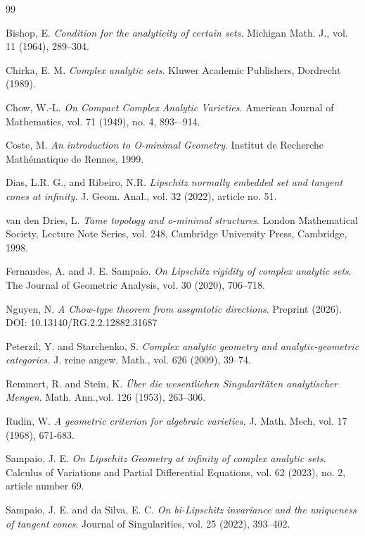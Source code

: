 \documentclass[a4paper,11pt]{amsart}
\begin{document}
\begin{thebibliography}{99}

{Bishop, E.} 
{\it Condition for the analyticity of certain sets}. 
Michigan Math. J., vol. 11 (1964), 289--304. 

{Chirka, E. M.}
{\it Complex analytic sets}.
Kluwer Academic Publishers, Dordrecht (1989).

{Chow, W.-L.}
{\it  On Compact Complex Analytic Varieties}. 
American Journal of Mathematics, vol. 71 (1949), no. 4, 893-–914. 

{Coste, M.}
{\it An introduction to O-minimal Geometry}. 
Institut de Recherche Math\'ematique de Rennes, 1999.

{Dias, L.R. G., and Ribeiro, N.R.}
{\it Lipschitz normally embedded set and tangent cones at infinity}. 
J. Geom. Anal., vol. 32 (2022), article no. 51.

van den Dries, L.
{\it Tame topology and o-minimal structures}. London Mathematical Society,
Lecture Note Series, vol. 248, Cambridge University Press, Cambridge, 1998.

{Fernandes, A. and J. E. Sampaio.}
{\it On Lipschitz rigidity of complex analytic sets}.
The Journal of Geometric Analysis, vol. 30 (2020), 706--718.

{Nguyen, N.}
{\it A Chow-type theorem from assymtotic directions}.
Preprint (2026). DOI: 10.13140/RG.2.2.12882.31687


{Peterzil, Y. and Starchenko, S.}
{\it Complex analytic geometry and analytic-geometric categories.}
J. reine angew. Math., vol. 626 (2009), 39--74.

{Remmert, R. and Stein, K.}
{\it \"Uber die wesentlichen  Singularit\"aten analytischer Mengen}. Math. Ann.,vol. 126 (1953), 263--306.

{Rudin, W.}
{\it A geometric criterion for algebraic varieties.}
J. Math. Mech, vol. 17 (1968), 671-683. 

{Sampaio, J. E.}
{\it On Lipschitz Geometry at infinity of complex analytic sets}. 
Calculus of Variations and Partial Differential Equations, vol. 62 (2023), no. 2, article number 69.

{Sampaio, J. E. and da Silva, E. C.}
{\it On bi-Lipschitz invariance and the uniqueness of tangent cones}. Journal of Singularities, vol. 25 (2022), 393--402.


\end{thebibliography}
\end{document}
